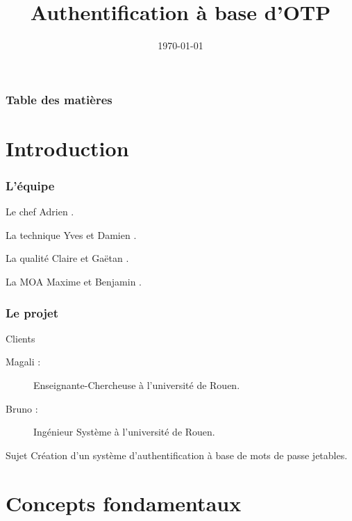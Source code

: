 \documentclass[xcolor=table]{beamer}
\title[M1SSI]{Authentification \`{a} base d'OTP}
\institute[Université de Rouen] {
Université de Rouen \\
\medskip
}
\date{\today}
\begin{document}
\begin{frame}
\titlepage
\end{frame}

\begin{frame}
\frametitle{Table des matières}
\tableofcontents
\end{frame}

\section{Introduction}

\begin{frame}
\frametitle{L'équipe}
\begin{block}{Le chef}
Adrien .
\end{block}
\begin{block}{La technique}
Yves  et Damien .
\end{block}
\begin{block}{La qualité}
Claire  et Gaëtan .
\end{block}
\begin{block}{La MOA}
Maxime  et Benjamin .
\end{block}
\end{frame}


\begin{frame}
\frametitle{Le projet}

\begin{block}{Clients}
\begin{description}
\item[Magali :] Enseignante-Chercheuse à l'université de Rouen.\\
\item[Bruno :] Ingénieur Système à l'université de Rouen.
\end{description}
\end{block}

\begin{block}{Sujet}
Création d'un système d'authentification à base de mots de passe jetables.
\end{block}
\end{frame}




\section{Concepts fondamentaux}
\end{document}
